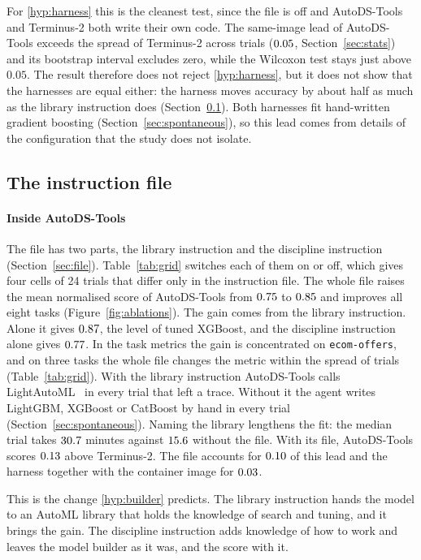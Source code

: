 For \ref{hyp:harness} this is the cleanest test, since the file is off and
AutoDS-Tools and Terminus-2 both write their own code. The same-image lead
of AutoDS-Tools exceeds the spread of Terminus-2 across trials
($0.05$, Section~\ref{sec:stats}) and its bootstrap interval
excludes zero, while the Wilcoxon test stays just above $0.05$. The result
therefore does not reject \ref{hyp:harness}, but it does not show that the
harnesses are equal either: the harness moves accuracy by about half as
much as the library instruction does (Section~\ref{sec:abl-file}). Both
harnesses fit hand-written gradient boosting (Section~\ref{sec:spontaneous}),
so this lead comes from details of the configuration that the study does
not isolate.

\subsection{The instruction file}
\label{sec:abl-file}

\paragraph{Inside AutoDS-Tools}
The file has two parts, the library instruction and the discipline
instruction (Section~\ref{sec:file}). Table~\ref{tab:grid} switches each of
them on or off, which gives four cells of 24 trials that differ only in the
instruction file. The whole file raises the mean normalised score of
AutoDS-Tools from $0.75$ to $0.85$ and improves all eight tasks
(Figure~\ref{fig:ablations}). The gain comes from the library instruction.
Alone it gives $0.87$, the level of tuned XGBoost, and the discipline
instruction alone gives $0.77$. In the task metrics the gain is
concentrated on \texttt{ecom-offers}, and on three tasks the whole file
changes the metric within the spread of trials (Table~\ref{tab:grid}). With the library instruction
AutoDS-Tools calls LightAutoML~\citep{vakhrushev2021lightautoml} in every
trial that left a trace. Without it the agent writes LightGBM, XGBoost or
CatBoost by hand in every trial (Section~\ref{sec:spontaneous}). Naming the
library lengthens the fit: the median trial takes $30.7$ minutes
against $15.6$ without the file. With its file, AutoDS-Tools
scores $0.13$ above Terminus-2. The file accounts for
$0.10$ of this lead and the harness together with the container
image for $0.03$.

This is the change \ref{hyp:builder} predicts. The library instruction hands
the model to an AutoML library that holds the knowledge of search and
tuning, and it brings the gain. The discipline instruction adds knowledge of
how to work and leaves the model builder as it was, and the score with it.


